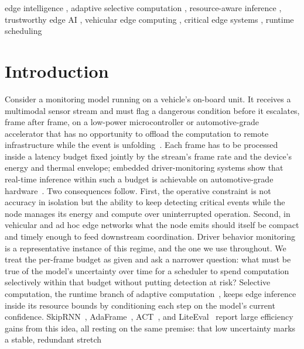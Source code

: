 \documentclass[a4paper,fleqn]{cas-dc}
\begin{document}
\begin{keywords}
edge intelligence \sep
adaptive selective computation \sep
resource-aware inference \sep
trustworthy edge AI \sep
vehicular edge computing \sep
critical edge systems \sep
runtime scheduling
\end{keywords}
\maketitle
{}
\section{Introduction}
\label{sec:introducao}
Consider a monitoring model running on a vehicle's on-board unit. It receives a
multimodal sensor stream and must flag a dangerous condition before it escalates,
frame after frame, on a low-power microcontroller or automotive-grade accelerator
that has no opportunity to offload the computation to remote infrastructure while
the event is unfolding~\cite{bouhsissin2023driver,ortega2020dmd}. Each frame has to
be processed inside a latency budget fixed jointly by the stream's frame rate and
the device's energy and thermal envelope; embedded driver-monitoring systems show
that real-time inference within such a budget is achievable on automotive-grade
hardware~\cite{hariharan2023driveredge,tinydl2025driverstate}. Two consequences
follow. First, the operative constraint is not accuracy in isolation but the
ability to keep detecting critical events while the node manages its energy and
compute over uninterrupted operation. Second, in vehicular and ad hoc edge
networks what the node emits should itself be compact and timely enough to feed
downstream coordination. Driver behavior monitoring is a representative instance of
this regime, and the one we use throughout. We treat the per-frame budget as given
and ask a narrower question: what must be true of the model's uncertainty over time
for a scheduler to spend computation selectively within that budget without putting
detection at risk?
Selective computation, the runtime branch of adaptive
computation~\cite{han2022dynamic}, keeps edge inference inside its resource bounds
by conditioning each step on the model's current confidence. SkipRNN~\cite{campos2018skip},
AdaFrame~\cite{wu2019adaframe}, ACT~\cite{graves2016adaptive}, and
LiteEval~\cite{wu2019liteeval} report large efficiency gains from this idea, all
resting on the same premise: that low uncertainty marks a stable, redundant stretch
\end{document}
